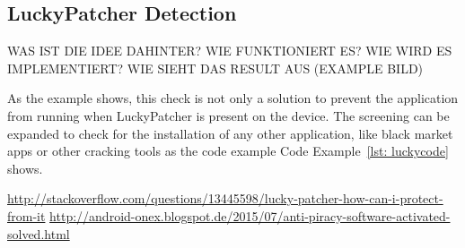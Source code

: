 \subsection{LuckyPatcher Detection} \label{subsection:counter-tampering-luckypatcher}

WAS IST DIE IDEE DAHINTER? WIE FUNKTIONIERT ES? WIE WIRD ES IMPLEMENTIERT? WIE SIEHT DAS RESULT AUS (EXAMPLE BILD)\newline

As the example shows, this check is not only a solution to prevent the application from running when LuckyPatcher is present on the device. The screening can be expanded to check for the installation of any other application, like black market apps or other cracking tools as the code example Code Example~\ref{lst: luckycode} shows.

\url{http://stackoverflow.com/questions/13445598/lucky-patcher-how-can-i-protect-from-it}\newline
\url{http://android-onex.blogspot.de/2015/07/anti-piracy-software-activated-solved.html}\newline


